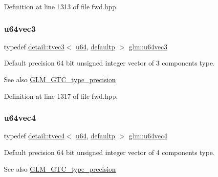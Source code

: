 Definition at line 1313 of file fwd.\+hpp.

\mbox{\label{group__gtc__type__precision_gae934e74663d832989066cc852560866d}} 
\subsubsection{\texorpdfstring{u64vec3}{u64vec3}}
{\footnotesize\ttfamily typedef \hyperlink{structglm_1_1detail_1_1tvec3}{detail\+::tvec3}$<$ \hyperlink{group__gtc__type__precision_ga71cedd4972f9cb1a5e14dfe5ab83ecd7}{u64}, \hyperlink{namespaceglm_a0f04f086094c747d227af4425893f545a9d21ccd8b5a009ec7eb7677befc3bf51}{defaultp} $>$ \hyperlink{group__gtc__type__precision_gae934e74663d832989066cc852560866d}{glm\+::u64vec3}}

Default precision 64 bit unsigned integer vector of 3 components type. \begin{DoxySeeAlso}{See also}
\hyperlink{group__gtc__type__precision}{G\+L\+M\+\_\+\+G\+T\+C\+\_\+type\+\_\+precision} 
\end{DoxySeeAlso}


Definition at line 1317 of file fwd.\+hpp.

\mbox{\label{group__gtc__type__precision_ga59d78a1ff6d275bbb425dce92f607b9c}} 
\subsubsection{\texorpdfstring{u64vec4}{u64vec4}}
{\footnotesize\ttfamily typedef \hyperlink{structglm_1_1detail_1_1tvec4}{detail\+::tvec4}$<$ \hyperlink{group__gtc__type__precision_ga71cedd4972f9cb1a5e14dfe5ab83ecd7}{u64}, \hyperlink{namespaceglm_a0f04f086094c747d227af4425893f545a9d21ccd8b5a009ec7eb7677befc3bf51}{defaultp} $>$ \hyperlink{group__gtc__type__precision_ga59d78a1ff6d275bbb425dce92f607b9c}{glm\+::u64vec4}}

Default precision 64 bit unsigned integer vector of 4 components type. \begin{DoxySeeAlso}{See also}
\hyperlink{group__gtc__type__precision}{G\+L\+M\+\_\+\+G\+T\+C\+\_\+type\+\_\+precision} 
\end{DoxySeeAlso}


